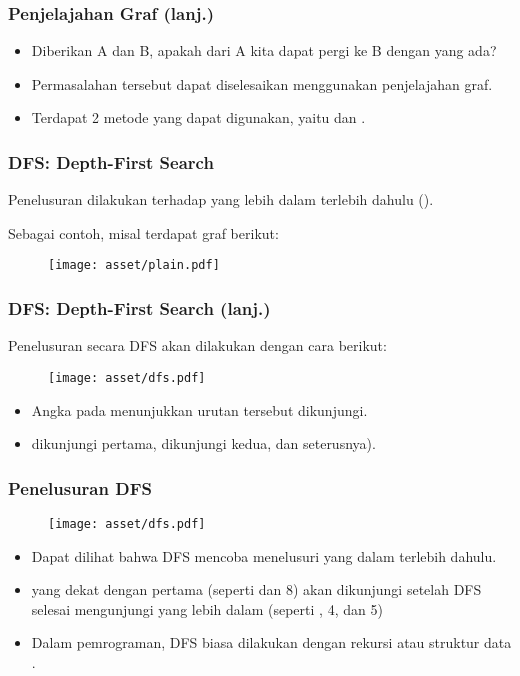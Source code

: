 \begin{frame}
\frametitle{Penjelajahan Graf (lanj.)}
\begin{itemize}
  \item Diberikan \fnode A dan \fnode B, apakah dari \fnode A kita dapat pergi ke \fnode B dengan \fedge yang ada?
  \item Permasalahan tersebut dapat diselesaikan menggunakan penjelajahan graf.
  \newline
  \item Terdapat 2 metode yang dapat digunakan, yaitu  dan .
\end{itemize}
\end{frame}

\begin{frame}
\frametitle{DFS: Depth-First Search}
Penelusuran dilakukan terhadap \fnode yang lebih dalam terlebih dahulu (). 

Sebagai contoh, misal terdapat graf berikut:

\begin{figure}
  \centering
  \texttt{[image: asset/plain.pdf]}
\end{figure}
\end{frame}

\begin{frame}
\frametitle{DFS: Depth-First Search (lanj.)}
Penelusuran secara DFS akan dilakukan dengan cara berikut:
\begin{figure}
  \centering
  \texttt{[image: asset/dfs.pdf]}
\end{figure}
\begin{itemize}
  \item Angka pada \fnode menunjukkan urutan \fnode tersebut dikunjungi.
  \item {} dikunjungi pertama,  dikunjungi kedua, dan seterusnya).
\end{itemize}
\end{frame}

\begin{frame}
\frametitle{Penelusuran DFS}
\begin{figure}
  \centering
  \texttt{[image: asset/dfs.pdf]}
\end{figure}
\begin{itemize}
  \item Dapat dilihat bahwa DFS mencoba menelusuri \fnode yang dalam terlebih dahulu.
  \item \fNode yang dekat dengan \fnode pertama (seperti  dan 8) akan dikunjungi setelah DFS selesai mengunjungi \fnode yang lebih dalam (seperti , 4, dan 5)
  \item Dalam pemrograman, DFS biasa dilakukan dengan rekursi atau struktur data .
\end{itemize}
\end{frame}



